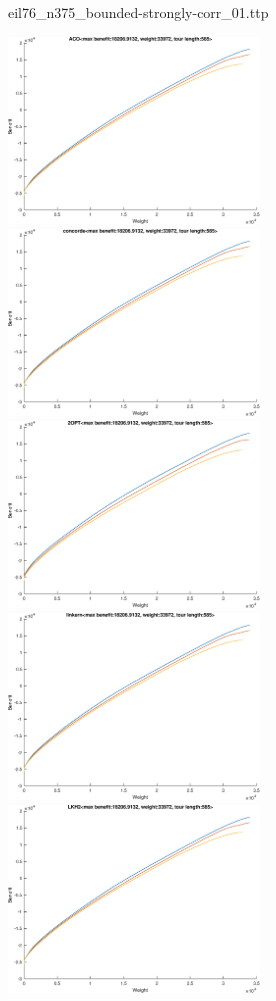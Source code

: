 \documentclass{article}
\begin{document}
\newpage
eil76\_n375\_bounded-strongly-corr\_01.ttp

\noindent
\includegraphics[width=0.5\textwidth]{eil76figs/eil76_n375_bounded-strongly-corr_01.ttp.aco.txt.atsf.eps}
\includegraphics[width=0.5\textwidth]{eil76figs/eil76_n375_bounded-strongly-corr_01.ttp.con.txt.atsf.eps}
\includegraphics[width=0.5\textwidth]{eil76figs/eil76_n375_bounded-strongly-corr_01.ttp.inv.txt.atsf.eps}
\includegraphics[width=0.5\textwidth]{eil76figs/eil76_n375_bounded-strongly-corr_01.ttp.lkh.txt.atsf.eps}
\includegraphics[width=0.5\textwidth]{eil76figs/eil76_n375_bounded-strongly-corr_01.ttp.lkh2.txt.atsf.eps}
\end{document}
